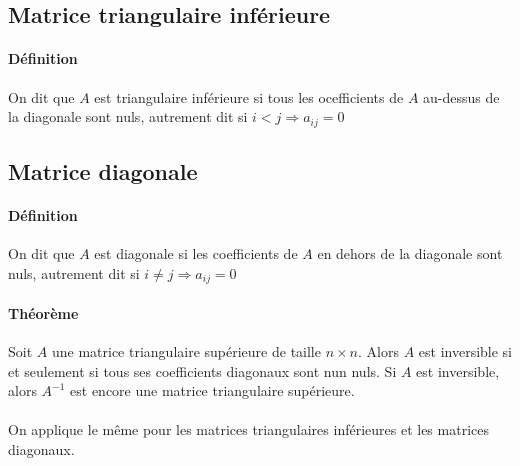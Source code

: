 %
\subsection{Matrice triangulaire inférieure}
%
\paragraph{Définition} On dit que $A$ est triangulaire inférieure si tous les ocefficients de $A$ au-dessus de la diagonale sont nuls, autrement dit si $i < j \Rightarrow a_{ij} = 0$

%
\subsection{Matrice diagonale}
%
\paragraph{Définition} On dit que $A$ est diagonale si les coefficients de $A$ en dehors de la diagonale sont nuls, autrement dit si $i\neq j \Rightarrow a_{ij} = 0$

\paragraph{Théorème} Soit $A$ une matrice triangulaire supérieure de taille $n\times n$. Alors $A$ est inversible si et seulement si tous ses coefficients diagonaux sont nun nuls. Si $A$ est inversible, alors $A^{-1}$ est encore une matrice triangulaire supérieure.
\\\\
On applique le même pour les matrices triangulaires inférieures et les matrices diagonaux.

